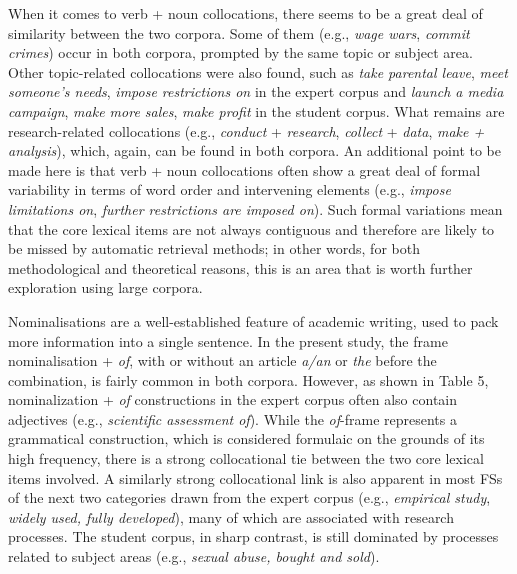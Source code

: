 \documentclass[12pt]{article}
\newenvironment{styleStandard}{\setlength\leftskip{0cm}\setlength\rightskip{0cm plus 1fil}\setlength\parindent{0cm}\setlength\parfillskip{0pt plus 1fil}\setlength\parskip{0cm plus 1pt}\writerlistparindent\writerlistleftskip\leavevmode\normalfont\normalsize\writerlistlabel\ignorespaces}{\unskip\vspace{0cm plus 1pt}\par}
\newcommand\writerlistleftskip{}
\newcommand\writerlistparindent{}
\newcommand\writerlistlabel{}
\begin{document}
\begin{styleStandard}
When it comes to verb + noun collocations, there seems to be a great deal of similarity between the two corpora. Some of them (e.g., \textit{wage wars}, \textit{commit crimes}) occur in both corpora, prompted by the same topic or subject area. Other topic-related collocations were also found, such as \textit{take parental leave}, \textit{meet someone’s needs}, \textit{impose restrictions on} in the expert corpus and \textit{launch a media campaign}, \textit{make more sales}, \textit{make profit} in the student corpus. What remains are research-related collocations (e.g., \textit{conduct} + \textit{research}, \textit{collect} + \textit{data}, \textit{make + analysis}), which, again, can be found in both corpora. An additional point to be made here is that verb + noun collocations often show a great deal of formal variability in terms of word order and intervening elements (e.g., \textit{impose limitations on}, \textit{further restrictions are imposed on}). Such formal variations mean that the core lexical items are not always contiguous and therefore are likely to be missed by automatic retrieval methods; in other words, for both methodological and theoretical reasons, this is an area that is worth further exploration using large corpora. 
\end{styleStandard}

\begin{styleStandard}
Nominalisations are a well-established feature of academic writing, used to pack more information into a single sentence. In the present study, the frame nominalisation + \textit{of}, with or without an article \textit{a/an} or \textit{the} before the combination, is fairly common in both corpora. However, as shown in Table 5, nominalization + \textit{of }constructions in the expert corpus often also contain adjectives (e.g., \textit{scientific assessment of}). While the \textit{of}{}-frame represents a grammatical construction, which is considered formulaic on the grounds of its high frequency, there is a strong collocational tie between the two core lexical items involved. A similarly strong collocational link is also apparent in most FSs of the next two categories drawn from the expert corpus (e.g., \textit{empirical study}, \textit{widely used, fully developed}), many of which are associated with research processes. The student corpus, in sharp contrast, is still dominated by processes related to subject areas (e.g., \textit{sexual abuse, bought and sold}). 
\end{styleStandard}
\end{document}
